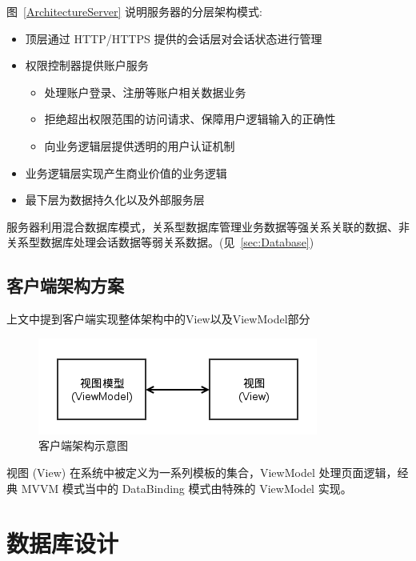 图~\ref{ArchitectureServer} 说明服务器的分层架构模式:

\begin{itemize}
  \item 顶层通过 HTTP/HTTPS 提供的会话层对会话状态进行管理
  \item 权限控制器提供账户服务
  \begin{itemize}
    \item 处理账户登录、注册等账户相关数据业务
    \item 拒绝超出权限范围的访问请求、保障用户逻辑输入的正确性
    \item 向业务逻辑层提供透明的用户认证机制
  \end{itemize}
  \item 业务逻辑层实现产生商业价值的业务逻辑
  \item 最下层为数据持久化以及外部服务层
\end{itemize}

服务器利用混合数据库模式，关系型数据库管理业务数据等强关系关联的数据、非关系型数据库处理会话数据等弱关系数据。(见~\ref{sec:Database})

\subsection{客户端架构方案}

上文中提到客户端实现整体架构中的View以及ViewModel部分

\begin{figure}[!h]
  \begin{center}
    \includegraphics[scale=0.5]{figures/diagram-architecture-client.png}
    \caption{客户端架构示意图\label{ArchitectureClient}}
  \end{center}
\end{figure}

视图 (View) 在系统中被定义为一系列模板的集合，ViewModel 处理页面逻辑，经典 MVVM 模式当中的 DataBinding 模式由特殊的 ViewModel 实现。

\section{数据库设计\label{sec:Database}}

